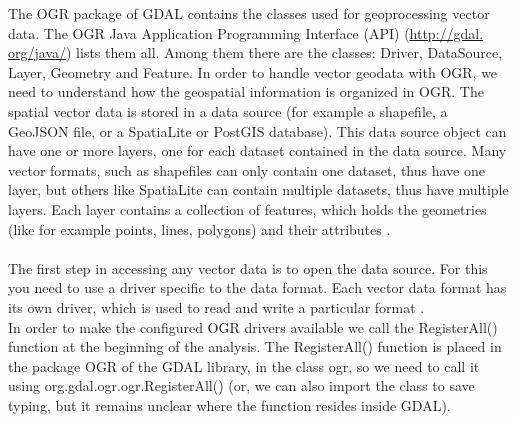 \documentclass {article}
\begin{document}
The OGR package of GDAL contains the classes used for geoprocessing vector data. The OGR Java Application Programming Interface (API) \cite{osgeo_gdal_nodate} (\href{http://gdal.org/java/}{http://gdal.\\org/java/}) lists them all.
 Among them there are the classes: Driver, DataSource, Layer, Geometry and Feature. In order to handle vector geodata with OGR, we need to understand how the geospatial information is organized in OGR. The spatial vector data is stored in a data source (for example a shapefile, a GeoJSON file, or a SpatiaLite or PostGIS database). This data source object can have one or more layers, one for each dataset contained in the data source. Many vector formats, such as shapefiles can only contain one dataset, thus have one layer, but others like SpatiaLite can contain multiple datasets, thus have multiple layers. Each layer contains a collection of features, which holds the geometries (like for example points, lines, polygons) and their attributes  \cite{garrard_geoprocessing_2016}. \\
\\
The first step in accessing any vector data is to open the data source. For this you need to use a driver specific to the data format. Each vector data format has its own driver, which is used to read and write a particular format \cite{garrard_geoprocessing_2016}.\\
In order to make the configured OGR drivers available we call the RegisterAll() function at the beginning of the analysis. The RegisterAll() function is placed in the package OGR of the GDAL library, in the class ogr, so we need to call it using org.gdal.ogr.ogr.RegisterAll() (or, we can also import the class to save typing, but it remains unclear where the function resides inside GDAL).                     
\end{document}
